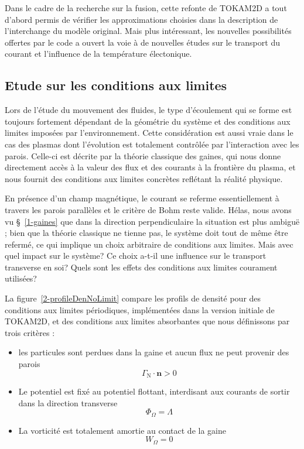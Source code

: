 \begin{refsection}
Dans le cadre de la recherche sur la fusion, cette refonte de TOKAM2D a tout
d'abord permis de vérifier les approximations choisies dans la description de
l'interchange du modèle original. Mais plus intéressant, les nouvelles
possibilités offertes par le code a ouvert la voie à de nouvelles études sur le transport du courant
et l'influence de la température électonique.

\subsection{Etude sur les conditions aux limites}
	
	Lors de l'étude du mouvement des fluides, le type d'écoulement qui se
	forme est toujours fortement dépendant de la géométrie du système et des conditions aux limites
	imposées par l'environnement. Cette considération est aussi vraie dans le
	cas des plasmas dont l'évolution est totalement contrôlée par l'interaction
	avec les parois. Celle-ci est décrite par la théorie classique des gaines,
	qui nous donne directement accès à la valeur des flux et des courants à la
	frontière du plasma, et nous fournit des conditions aux limites concrètes
	reflétant la réalité physique.
	
	En présence d'un champ magnétique, le courant se referme essentiellement
	à travers les parois parallèles et le critère de Bohm reste valide.
	Hélas, nous avons vu §~\ref{1-gaines} que dans la direction
	perpendiculaire la situation est plus ambiguë ; bien que la théorie
	classique ne tienne pas, le système doit tout de même être refermé, ce qui
	implique un choix arbitraire de conditions aux limites. Mais avec quel impact sur le
	système? Ce choix a-t-il une influence sur le transport transverse en soi?
	Quels sont les effets des conditions aux limites courament utilisées?
	
	La figure~\ref{2-profileDenNoLimit} compare les profils de densité pour des
	conditions aux limites périodiques, implémentées dans la version initiale de
	TOKAM2D, et des conditions aux limites absorbantes que nous définissons par
	trois critères :
	
	\begin{itemize}
	  \item les particules sont perdues dans la gaine et aucun flux ne peut
	  provenir des parois 
	  \begin{equation}
	  	\Gamma_\text{N}\cdot\mathbf n>0
	  \end{equation}
	  \item Le
	potentiel est fixé au potentiel flottant, interdisant aux
	courants de sortir dans la direction transverse
	\begin{equation}
	  	\Phi_\Omega=\Lambda
	  \end{equation}
	\item La vorticité est totalement amortie au contact de la gaine 
	\begin{equation}
	  	W_\Omega=0
	  \end{equation}
	\end{itemize}
	

\end{refsection}
